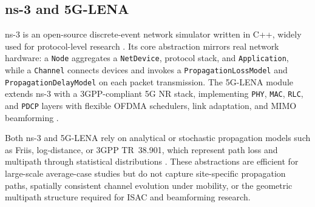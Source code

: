 \subsection{ns-3 and 5G-LENA}
ns-3 is an open-source discrete-event network simulator written in C++, widely used for protocol-level research \cite{ns3}.
Its core abstraction mirrors real network hardware: a \texttt{Node} aggregates a \texttt{NetDevice}, protocol stack, and \texttt{Application}, while a \texttt{Channel} connects devices and invokes a \texttt{PropagationLossModel} and \texttt{PropagationDelayModel} on each packet transmission.
The 5G-LENA module extends ns-3 with a 3GPP-compliant 5G NR stack, implementing \texttt{PHY}, \texttt{MAC}, \texttt{RLC}, and \texttt{PDCP} layers with flexible OFDMA schedulers, link adaptation, and MIMO beamforming \cite{5glena,bojovic_mimo,bojovic_beamforming}.

Both ns-3 and 5G-LENA rely on analytical or stochastic propagation models such as Friis, log-distance, or 3GPP TR~38.901, which represent path loss and multipath through statistical distributions \cite{ns3,tr38901,5glena}.
These abstractions are efficient for large-scale average-case studies but do not capture site-specific propagation paths, spatially consistent channel evolution under mobility, or the geometric multipath structure required for ISAC and beamforming research.
